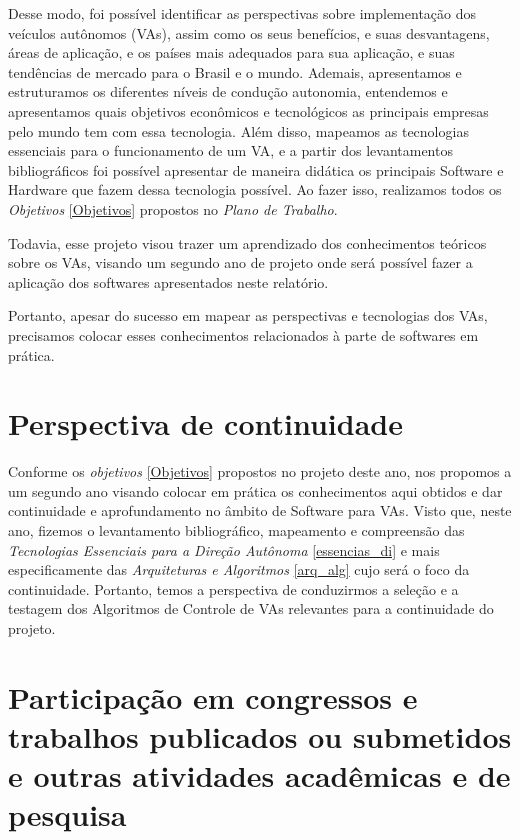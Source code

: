 Desse modo, foi possível identificar as perspectivas sobre implementação dos veículos autônomos (VAs), assim como os seus benefícios, e suas desvantagens, áreas de aplicação, e os países mais adequados para sua aplicação, e suas tendências de mercado para o Brasil e o mundo.
Ademais, apresentamos e estruturamos os diferentes níveis de condução autonomia, entendemos e apresentamos quais objetivos econômicos e tecnológicos as principais empresas pelo mundo tem com essa tecnologia.
Além disso, mapeamos as tecnologias essenciais para o funcionamento de um VA, e a partir dos levantamentos bibliográficos foi possível apresentar de maneira didática os principais Software e Hardware que fazem dessa tecnologia possível.
Ao fazer isso, realizamos todos os \textit{Objetivos} \ref{Objetivos} propostos no \textit{Plano de Trabalho}.

Todavia, esse projeto visou trazer um aprendizado dos conhecimentos teóricos sobre os VAs, visando um segundo ano de projeto onde será possível fazer a aplicação dos softwares apresentados neste relatório.

Portanto, apesar do sucesso em mapear as perspectivas e tecnologias dos VAs, precisamos colocar esses conhecimentos relacionados à parte de softwares em prática.



\chapter{Perspectiva de continuidade} \label{continuidade}

Conforme os \textit{objetivos} \ref{Objetivos} propostos no projeto deste ano, nos propomos a um segundo ano visando colocar em prática os conhecimentos aqui obtidos e dar continuidade e aprofundamento no âmbito de Software para VAs. Visto que, neste ano, fizemos o levantamento bibliográfico, mapeamento e compreensão das \textit{Tecnologias Essenciais para a Direção Autônoma} \ref{essencias_di} e mais especificamente das \textit{Arquiteturas e Algoritmos} \ref{arq_alg} cujo será o foco da continuidade. Portanto, temos a perspectiva de conduzirmos a seleção e a testagem dos Algoritmos de Controle de VAs relevantes para a continuidade do projeto.

\chapter{Participação em congressos e trabalhos publicados ou submetidos e outras
atividades acadêmicas e de pesquisa} \label{eventos}


